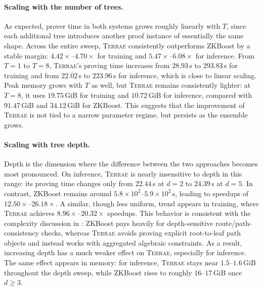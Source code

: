 \paragraph{Scaling with the number of trees.}
As expected, prover time in both systems grows roughly linearly with $T$, since
each additional tree introduces another proof instance of essentially the same
shape.  Across the entire sweep, \textsc{Terrae} consistently outperforms
ZKBoost by a stable margin: $4.42\times$--$4.70\times$ for training and
$5.47\times$--$6.08\times$ for inference.  From $T=1$ to $T=8$,
\textsc{Terrae}'s proving time increases from $28.93$\,s to $293.83$\,s for
training and from $22.02$\,s to $223.96$\,s for inference, which is close to
linear scaling.  Peak memory grows with $T$ as well, but \textsc{Terrae}
remains consistently lighter: at $T=8$, it uses $19.75$\,GiB for training and
$10.72$\,GiB for inference, compared with $91.47$\,GiB and $34.12$\,GiB for
ZKBoost.  This suggests that the improvement of \textsc{Terrae} is not tied to
a narrow parameter regime, but persists as the ensemble grows.

\paragraph{Scaling with tree depth.}
Depth is the dimension where the difference between the two approaches becomes
most pronounced.  On inference, \textsc{Terrae} is nearly insensitive to depth
in this range: its proving time changes only from $22.44$\,s at $d=2$ to
$24.39$\,s at $d=5$.  In contrast, ZKBoost remains around
$5.8\times 10^2$--$5.9\times 10^2$\,s, leading to speedups of
$12.50\times$--$26.18\times$.  A similar, though less uniform, trend appears in
training, where \textsc{Terrae} achieves $8.96\times$--$20.32\times$ speedups.
This behavior is consistent with the complexity discussion in
: ZKBoost pays heavily for depth-sensitive
route/path-consistency checks, whereas \textsc{Terrae} avoids proving explicit
root-to-leaf path objects and instead works with aggregated algebraic
constraints.  As a result, increasing depth has a much weaker effect on
\textsc{Terrae}, especially for inference.  The same effect appears in memory:
for inference, \textsc{Terrae} stays near $1.5$--$1.6$\,GiB throughout the depth
sweep, while ZKBoost rises to roughly $16$--$17$\,GiB once $d\geq 3$.

